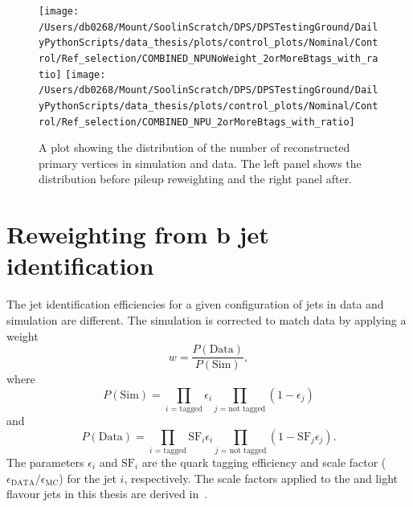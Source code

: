 \begin{figure}[htpb]
	\centering
	\texttt{[image: /Users/db0268/Mount/SoolinScratch/DPS/DPSTestingGround/DailyPythonScripts/data\_thesis/plots/control\_plots/Nominal/Control/Ref\_selection/COMBINED\_NPUNoWeight\_2orMoreBtags\_with\_ratio]}
	\texttt{[image: /Users/db0268/Mount/SoolinScratch/DPS/DPSTestingGround/DailyPythonScripts/data\_thesis/plots/control\_plots/Nominal/Control/Ref\_selection/COMBINED\_NPU\_2orMoreBtags\_with\_ratio]}
	\caption[A plot showing the distribution of the number of reconstructed primary vertices in simulation and data. The left panel shows the distribution before pileup reweighting and the right panel after.]{A plot showing the distribution of the number of reconstructed primary vertices in simulation and data. The left panel shows the distribution before pileup reweighting and the right panel after.}
	\label{fig:PU}
\end{figure}

\section{Reweighting from b jet identification} %
\label{sub:reweighting_from_b_jet_identification}

The \bquark{} jet identification efficiencies for a given configuration of jets in data and simulation are different.
The simulation is corrected to match data by applying a weight
\begin{equation*}
	w = \frac{P(\mathrm{Data})}{P(\mathrm{Sim})},
\end{equation*}
where
\begin{equation*}
	P(\mathrm{Sim}) = \prod_{i\text{ = tagged}}\epsilon_{i}\prod_{j\text{ = not tagged}}(1 - \epsilon_{j})
\end{equation*}
and
\begin{equation*}
	P(\mathrm{Data}) = \prod_{i\text{ = tagged}}\mathrm{SF}_{i}\epsilon_{i}\prod_{j\text{ = not tagged}}(1 - \mathrm{SF}_{j}\epsilon_{j}).
\end{equation*}
The parameters $\epsilon_{i}$ and $\mathrm{SF}_{i}$ are the \bquark{} quark tagging efficiency and scale factor ($\epsilon_{\mathrm{DATA}}/\epsilon_{\mathrm{MC}}$) for the jet $i$, respectively.
The scale factors applied to the \bquark{} and light flavour jets in this thesis are derived in~\cite{Event:BTV}.


